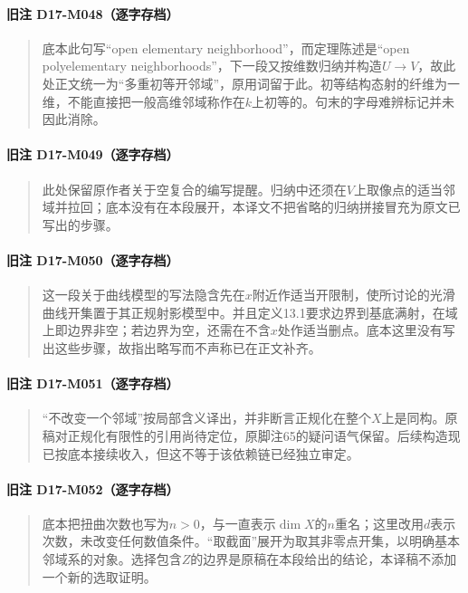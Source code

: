 \paragraph*{旧注 D17-M048（逐字存档）}
\begin{quote}
底本此句写“open elementary neighborhood”，而定理陈述是“open polyelementary neighborhoods”，下一段又按维数归纳并构造$U\to V$，故此处正文统一为“多重初等开邻域”，原用词留于此。初等结构态射的纤维为一维，不能直接把一般高维邻域称作在$k$上初等的。句末的字母难辨标记并未因此消除。
\end{quote}

\paragraph*{旧注 D17-M049（逐字存档）}
\begin{quote}
此处保留原作者关于空复合的编写提醒。归纳中还须在$V$上取像点的适当邻域并拉回；底本没有在本段展开，本译文不把省略的归纳拼接冒充为原文已写出的步骤。
\end{quote}

\paragraph*{旧注 D17-M050（逐字存档）}
\begin{quote}
这一段关于曲线模型的写法隐含先在$x$附近作适当开限制，使所讨论的光滑曲线开集置于其正规射影模型中。并且定义13.1要求边界到基底满射，在域上即边界非空；若边界为空，还需在不含$x$处作适当删点。底本这里没有写出这些步骤，故指出略写而不声称已在正文补齐。
\end{quote}

\paragraph*{旧注 D17-M051（逐字存档）}
\begin{quote}
“不改变一个邻域”按局部含义译出，并非断言正规化在整个$X$上是同构。原稿对正规化有限性的引用尚待定位，原脚注65的疑问语气保留。后续构造现已按底本接续收入，但这不等于该依赖链已经独立审定。
\end{quote}

\paragraph*{旧注 D17-M052（逐字存档）}
\begin{quote}
底本把扭曲次数也写为$n>0$，与一直表示$\dim X$的$n$重名；这里改用$d$表示次数，未改变任何数值条件。“取截面”展开为取其非零点开集，以明确基本邻域系的对象。选择包含$Z$的边界是原稿在本段给出的结论，本译稿不添加一个新的选取证明。
\end{quote}

